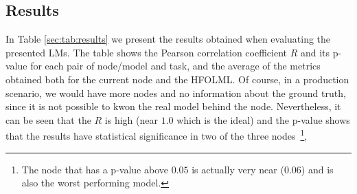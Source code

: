 \subsection{Results}

In Table \ref{sec:tab:results} we present the results obtained when evaluating the presented \glspl{LM}. 
The table shows the Pearson correlation coefficient $R$ and its p-value for each pair of node/model and task, and the average of the metrics obtained both for the current node and the \gls{HFOLML}. 
Of course, in a production scenario, we would have more nodes and no information about the ground truth, since it is not possible to kwon the real model behind the node. 
Nevertheless, it can be seen that the $R$ is high (near $1.0$ which is the ideal) and the p-value shows that the results have statistical significance in two of the three nodes~\footnote{The node that has a p-value above $0.05$ is actually very near ($0.06$) and is also the worst performing model.}, 

\begin{table}[htb!]
    \caption{Results obtained with the \gls{MLTB} and those published in the \gls{HFOLML}.}
    \label{sec:tab:results}
    \centering
\end{table}

